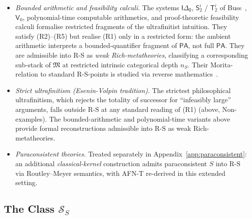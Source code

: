 \documentclass[11pt]{article}
\theoremstyle{plain}
\theoremstyle{definition}
\newcommand{\RS}{\mathrm{R\text{-}S}}
\newcommand{\cS}{\mathcal{S}}
\newcommand{\fM}{\mathfrak{M}}
\begin{document}
\begin{itemize}
\item \emph{Bounded arithmetic and feasibility calculi.} The systems $\mathsf{I\Delta_0}$, $\mathsf{S}_2^i$ / $\mathsf{T}_2^i$ of Buss~\cite{Buss1986}, $\mathsf{V}_0$, polynomial-time computable arithmetics, and proof-theoretic feasibility calculi formalise restricted fragments of the ultrafinitist intuition. They satisfy (R2)--(R5) but realise (R1) only in a restricted form: the ambient arithmetic interprets a bounded-quantifier fragment of $\mathsf{PA}$, not full $\mathsf{PA}$. They are admissible into $\RS$ as \emph{weak Rich-metatheories}, classifying a corresponding sub-stack of $\fM$ at restricted intrinsic categorical depth $n_S$. Their Morita-relation to standard $\RS$-points is studied via reverse mathematics~\cite{Simpson2009}.
\item \emph{Strict ultrafinitism (Esenin-Volpin tradition).} The strictest philosophical ultrafinitism, which rejects the totality of successor for ``infeasibly large'' arguments, falls outside $\RS$ at any standard reading of (R1) (above, Non-examples). The bounded-arithmetic and polynomial-time variants above provide formal reconstructions admissible into $\RS$ as weak Rich-metatheories.
\item \emph{Paraconsistent theories.} Treated separately in Appendix~\ref{app:paraconsistent}: an additional \emph{classical-kernel} construction admits paraconsistent $S$ into $\RS$ via Routley--Meyer semantics, with AFN-T re-derived in this extended setting.
\end{itemize}

\subsection{\texorpdfstring{The Class $\cS_S$}{The Class S\_S}}
\end{document}
